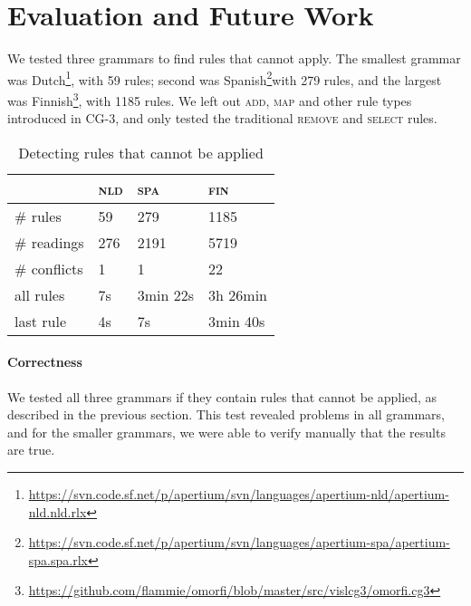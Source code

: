 \section{Evaluation and Future Work}
\label{sec:eval}

We tested three grammars to find rules that cannot apply. The smallest
grammar was
Dutch\footnote{\url{https://svn.code.sf.net/p/apertium/svn/languages/apertium-nld/apertium-nld.nld.rlx}},
with 59 rules; second was
Spanish\footnote{\url{https://svn.code.sf.net/p/apertium/svn/languages/apertium-spa/apertium-spa.spa.rlx}}with
279 rules, and the largest was
Finnish\footnote{\url{https://github.com/flammie/omorfi/blob/master/src/vislcg3/omorfi.cg3}},
with 1185 rules. We left out \textsc{add}, \textsc{map} and other rule types introduced in CG-3, and only tested the traditional \textsc{remove} and \textsc{select} rules.

\begin{table}[]
\centering
\begin{tabular}{|l|l|l|l|}
\hline
                      & \textsc{nld}  & \textsc{spa}  & \textsc{fin}  \\ \hline
\# rules      & 59              & 279      & 1185     \\ \hline
\# readings      & 276             & 2191     & 5719    \\ \hline
\# conflicts       & 1               & 1        & 22    \\ \hline
\clock{} all rules       & 7s              & 3min 22s    & 3h 26min    \\ \hline
\clock{} last rule       & 4s              & 7s                & 3min 40s    \\ \hline


\end{tabular}
\caption{Detecting rules that cannot be applied}
\label{table:res}
\end{table}

\paragraph{Correctness} We tested all three grammars if they contain
rules that cannot be applied, as described in the previous section.
This test revealed problems in all grammars, and for the smaller grammars, we were able to verify manually that the results are true.

